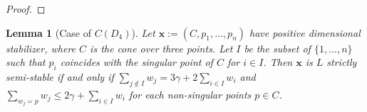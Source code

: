 \documentclass{amsart}
\numberwithin{equation}{section}
\newtheorem{lemma}[prop]{Lemma}
\theoremstyle{definition}
\begin{document}
\begin{proof}
    
\end{proof}







\begin{lemma}[Case of $C(D_4)$]\label{Lemma:wallD_4}
    Let $\mathbf{x} := (C, p_1, \dots , p_n)$ have positive dimensional stabilizer, where $C$ is the cone over three points. Let $I$ be the subset of $\{1, \dots , n\}$ such that $p_i$ coincides with the singular point of $C$ for $i \in I$. Then $\mathbf{x}$ is $L$ strictly semi-stable if and only if $\sum_{j \notin I} w_j = 3 \gamma + 2\sum_{i \in I} w_i$ and $\sum_{w_j = p} w_j \leq 2 \gamma + \sum_{i \in I}w_i$ for each non-singular points $p \in C$.
\end{lemma}
\end{document}

